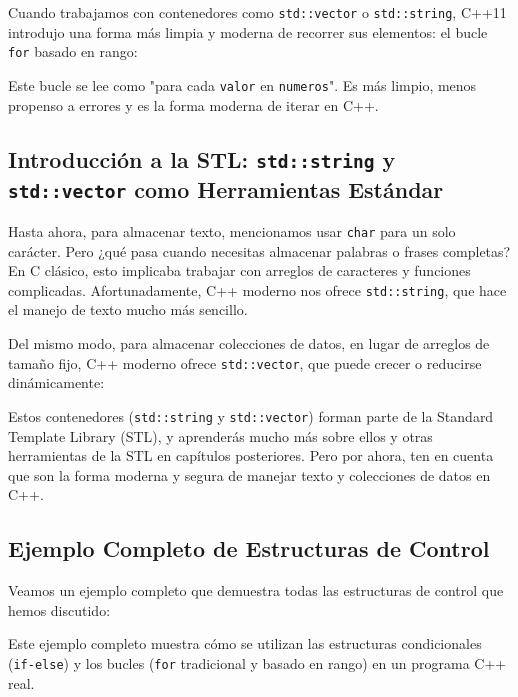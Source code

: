 Cuando trabajamos con contenedores como \texttt{std::vector} o \texttt{std::string}, C++11 introdujo una forma más limpia y moderna de recorrer sus elementos: el bucle \texttt{for} basado en rango:



Este bucle se lee como "para cada \texttt{valor} en \texttt{numeros}". Es más limpio, menos propenso a errores y es la forma moderna de iterar en C++.

\subsection{Introducción a la STL: \texttt{std::string} y \texttt{std::vector} como Herramientas Estándar}\label{subsec:introduccion_stl}

Hasta ahora, para almacenar texto, mencionamos usar \texttt{char} para un solo carácter. Pero ¿qué pasa cuando necesitas almacenar palabras o frases completas? En C clásico, esto implicaba trabajar con arreglos de caracteres y funciones complicadas. Afortunadamente, C++ moderno nos ofrece \texttt{std::string}, que hace el manejo de texto mucho más sencillo.



Del mismo modo, para almacenar colecciones de datos, en lugar de arreglos de tamaño fijo, C++ moderno ofrece \texttt{std::vector}, que puede crecer o reducirse dinámicamente:



Estos contenedores (\texttt{std::string} y \texttt{std::vector}) forman parte de la Standard Template Library (STL), y aprenderás mucho más sobre ellos y otras herramientas de la STL en capítulos posteriores. Pero por ahora, ten en cuenta que son la forma moderna y segura de manejar texto y colecciones de datos en C++.

\subsection{Ejemplo Completo de Estructuras de Control}

Veamos un ejemplo completo que demuestra todas las estructuras de control que hemos discutido:



Este ejemplo completo muestra cómo se utilizan las estructuras condicionales (\texttt{if-else}) y los bucles (\texttt{for} tradicional y basado en rango) en un programa C++ real.

